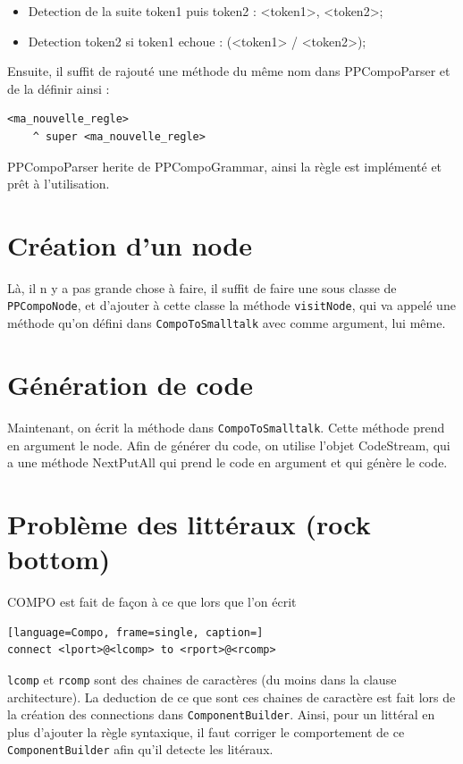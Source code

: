 \documentclass[11pt,a4paper,openany,oneside]{book}
\begin{document}
\begin{appendices}
\begin{itemize}
\item Detection de la suite token1 puis token2 : <token1>, <token2>;
\item  Detection token2 si token1 echoue : (<token1> / <token2>);
\end{itemize}


Ensuite, il suffit de rajouté une méthode du même nom dans PPCompoParser et de la définir ainsi :


\begin{lstlisting}[language=Compo, frame=single, caption=Création d'une régle]
<ma_nouvelle_regle>
	^ super <ma_nouvelle_regle>
\end{lstlisting}
	
PPCompoParser herite de PPCompoGrammar, ainsi la règle est implémenté et prêt à l'utilisation.

\section*{Création d'un node}
Là, il n y a pas grande chose à faire, il suffit de faire une sous classe de \texttt{PPCompoNode}, et d'ajouter à cette classe la méthode \texttt{visitNode}, 
qui va appelé une méthode qu'on défini dans \texttt{CompoToSmalltalk} avec comme argument, lui même.

\section*{Génération de code}
Maintenant, on écrit la méthode dans \texttt{CompoToSmalltalk}. Cette méthode prend en argument le node.
Afin de générer du code, on utilise l'objet CodeStream, qui a une méthode NextPutAll qui prend le code en argument et qui génère le code.

\section*{Problème des littéraux (rock bottom)}
COMPO est fait de façon à ce que lors que l'on écrit

\begin{lstlisting}[language=Compo, frame=single, caption=]
connect <lport>@<lcomp> to <rport>@<rcomp>
\end{lstlisting}

\texttt{lcomp} et \texttt{rcomp} sont des
chaines de caractères (du moins dans la clause architecture). La deduction de ce que sont ces chaines de caractère est fait 
lors de la création des connections dans \texttt{ComponentBuilder}. Ainsi, pour un littéral en plus d'ajouter la règle syntaxique, il faut
corriger le comportement de ce \texttt{ComponentBuilder} afin qu'il detecte les litéraux.


\end{appendices}
\glsaddall
\end{document}
